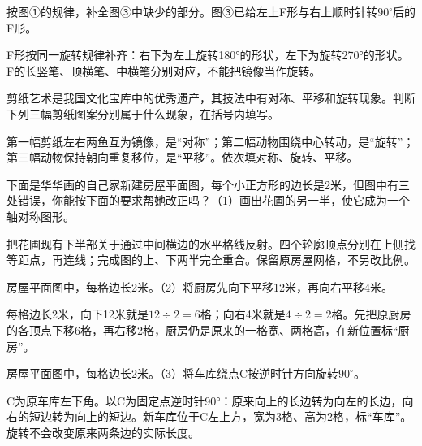 按图①的规律，补全图③中缺少的部分。图③已给左上F形与右上顺时针转\(90^\circ\)后的F形。\par
{}
\begin{BookAnswer}
F形按同一旋转规律补齐：右下为左上旋转180°的形状，左下为旋转270°的形状。F的长竖笔、顶横笔、中横笔分别对应，不能把镜像当作旋转。
\end{BookAnswer}

剪纸艺术是我国文化宝库中的优秀遗产，其技法中有对称、平移和旋转现象。判断下列三幅剪纸图案分别属于什么现象，在括号内填写。\par
{}
\begin{BookAnswer}
第一幅剪纸左右两鱼互为镜像，是“对称”；第二幅动物围绕中心转动，是“旋转”；第三幅动物保持朝向重复移位，是“平移”。依次填对称、旋转、平移。
\end{BookAnswer}

下面是华华画的自己家新建房屋平面图，每个小正方形的边长是2米，但图中有三处错误，你能按下面的要求帮她改正吗？（1）画出花圃的另一半，使它成为一个轴对称图形。\par
{}
\begin{BookAnswer}
把花圃现有下半部关于通过中间横边的水平格线反射。四个轮廓顶点分别在上侧找等距点，再连线；完成图的上、下两半完全重合。保留原房屋网格，不另改比例。
\end{BookAnswer}

房屋平面图中，每格边长2米。（2）将厨房先向下平移12米，再向右平移4米。\par
{}
\begin{BookAnswer}
每格边长2米，向下12米就是\(12\div2=6\)格；向右4米就是\(4\div2=2\)格。先把原厨房的各顶点下移6格，再右移2格，厨房仍是原来的一格宽、两格高，在新位置标“厨房”。
\end{BookAnswer}

房屋平面图中，每格边长2米。（3）将车库绕点C按逆时针方向旋转\(90^\circ\)。\par
{}
\begin{BookAnswer}
C为原车库左下角。以C为固定点逆时针90°：原来向上的长边转为向左的长边，向右的短边转为向上的短边。新车库位于C左上方，宽为3格、高为2格，标“车库”。旋转不会改变原来两条边的实际长度。
\end{BookAnswer}

